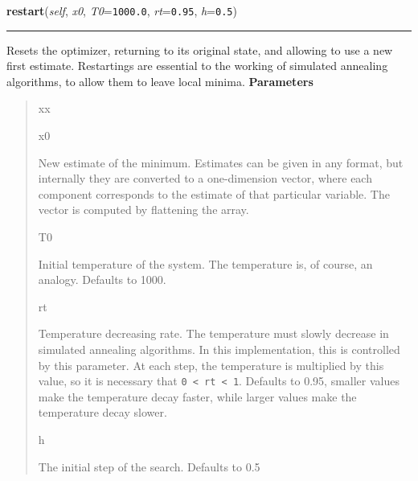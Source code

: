     \label{peach:sa:base:ContinuousSA:restart}

    \vspace{0.5ex}

\hspace{.8\funcindent}\begin{boxedminipage}{\funcwidth}

    \raggedright \textbf{restart}(\textit{self}, \textit{x0}, \textit{T0}={\tt 1000.0}, \textit{rt}={\tt 0.95}, \textit{h}={\tt 0.5})

    \vspace{-1.5ex}

    \rule{\textwidth}{0.5\fboxrule}
\setlength{\parskip}{2ex}

Resets the optimizer, returning to its original state, and allowing to
use a new first estimate. Restartings are essential to the working of
simulated annealing algorithms, to allow them to leave local minima.
\setlength{\parskip}{1ex}
      \textbf{Parameters}
      \vspace{-1ex}

      \begin{quote}
        \begin{Ventry}{xx}

          \item[x0]


New estimate of the minimum. Estimates can be given in any format,
but internally they are converted to a one-dimension vector, where
each component corresponds to the estimate of that particular
variable. The vector is computed by flattening the array.
          \item[T0]


Initial temperature of the system. The temperature is, of course, an
analogy. Defaults to 1000.
          \item[rt]


Temperature decreasing rate. The temperature must slowly decrease in
simulated annealing algorithms. In this implementation, this is
controlled by this parameter. At each step, the temperature is
multiplied by this value, so it is necessary that \texttt{0 < rt < 1}.
Defaults to 0.95, smaller values make the temperature decay faster,
while larger values make the temperature decay slower.
          \item[h]


The initial step of the search. Defaults to 0.5
        \end{Ventry}

      \end{quote}

    \end{boxedminipage}

